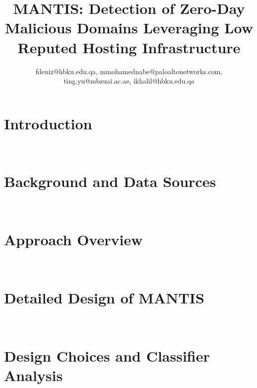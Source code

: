 \documentclass[conference,compsoc]{IEEEtran}
\newcommand{\system}{{\sc MANTIS}\xspace}
\begin{document}
\title{\system: Detection of Zero-Day Malicious Domains Leveraging Low Reputed Hosting Infrastructure}


\author{
fdeniz@hbku.edu.qa, mmohamednabe@paloaltonetworks.com, ting.yu@mbzuai.ac.ae, ikhalil@hbku.edu.qa
}

\maketitle

\begin{abstract}
 
\end{abstract}

\renewcommand{\headrulewidth}{0.0pt}
\thispagestyle{fancy}
\lhead{}
\rhead{}
\cfoot{}

\section{Introduction}~\label{sec:intro}


\section{Background and Data Sources}~\label{sec:background}
\vspace{-5mm}


\section{Approach Overview}~\label{sec:overview}
\vspace{-5mm}


\section{Detailed Design of \system}~\label{sec:approach}


\section{Design Choices and Classifier Analysis}~\label{sec:classifier}
\vspace{-3mm}

\end{document}

